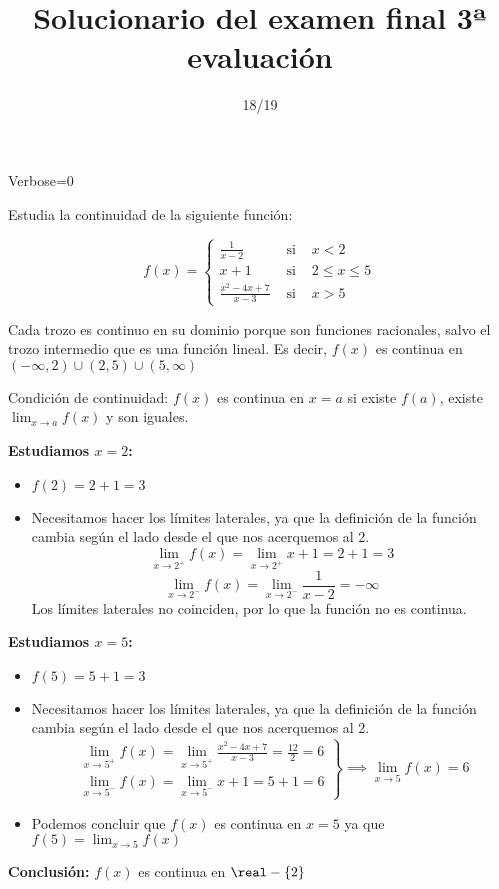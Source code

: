 \documentclass[palatino,nosec,nochap]{Docencia}
\title{Solucionario del examen final 3ª evaluación}
\author{}
\date{18/19}
\newif\ifverbose
\newcommand\BackgroundPic{%
\put(0,0){%
\parbox[b][\paperheight]{\paperwidth}{%
\vfill
\centering
\vfill
}}}
\begin{document}

\ifverbose
	\begin{sagesilent}
		Verbose=1
	\end{sagesilent}
\else
	\begin{sagesilent}
		Verbose=0
	\end{sagesilent}
\fi

\pagestyle{plain}
\maketitle

\AddToShipoutPicture{\BackgroundPic}

\newpage


\begin{problem}[1]
Estudia la continuidad de la siguiente función:

\[
f(x) = \left\{\begin{array}{ccc}
\frac{1}{x-2}&\text{ si }& x<2\\
x+1 & \text{ si } & 2\leq x\leq5\\
\frac{x^2-4x+7}{x-3} & \text{ si } & x>5
\end{array}\right.
\]
\solution

Cada trozo es continuo en su dominio porque son funciones racionales, salvo el trozo intermedio que es una función lineal.
%
Es decir, $f(x)$ es continua en $(-\infty,2)\cup(2,5)\cup(5,\infty)$

Condición de continuidad: $f(x)$ es continua en $x=a$ si existe $f(a)$, existe $\lim_{x\to a}f(x)$ y son iguales.

\textbf{Estudiamos $x=2$:}
\begin{itemize}
	\item 	$f(2)  = 2+1 = 3$
	\item Necesitamos hacer los límites laterales, ya que la definición de la función cambia según el lado desde el que nos acerquemos al 2. 
	\[ \lim_{x\to2^+} f(x) =  \lim_{x\to2^+} x+1=2+1=3\]
	\[ \lim_{x\to2^-} f(x) =  \lim_{x\to2^-} \frac{1}{x-2}=-\infty\]
	Los límites laterales no coinciden, por lo que la función no es continua.
\end{itemize}


\textbf{Estudiamos $x=5$:}
\begin{itemize}
	\item 	$f(5)  = 5+1 = 3$
	\item Necesitamos hacer los límites laterales, ya que la definición de la función cambia según el lado desde el que nos acerquemos al 2. 
	\[
	\left.\begin{array}{c}
			\lim_{x\to5^+} f(x) =  \lim_{x\to5^+} \frac{x^2-4x+7}{x-3} = \frac{12}{2} = 6\\
			\lim_{x\to5^-} f(x) =  \lim_{x\to5^-} x+1 = 5+1 = 6
		\end{array}\right\} \implies \lim_{x\to 5} f(x) = 6\]
	\item Podemos concluir que $f(x)$ es continua en $x=5$ ya que $f(5) = \lim_{x\to 5}f(x)$
\end{itemize}
\textbf{Conclusión:} $f(x)$ es continua en $\real-\{2\}$
\end{problem}
\end{document}

